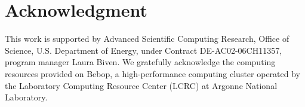 \documentclass[conference]{IEEEtran}
\begin{document}

\section*{Acknowledgment}

This work is supported by Advanced Scientific Computing Research, Office of Science, U.S. Department of Energy, under
Contract DE-AC02-06CH11357, program manager Laura Biven. We gratefully acknowledge the computing resources provided on
Bebop, a high-performance computing cluster operated by the Laboratory Computing Resource Center (LCRC) at Argonne
National Laboratory.




\end{document}
